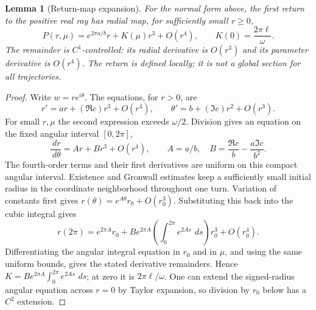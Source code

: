\documentclass[11pt,oneside]{book}
\newtheorem{lemma}[theorem]{Lemma}
\theoremstyle{definition}
\theoremstyle{remark}\newtheorem{remark}[theorem]{Remark}
\newcommand{\dd}{\,d}\newcommand{\id}{\operatorname{id}}
\begin{document}
\begin{lemma}[Return-map expansion]\label{d13:16:hopf-return-expansion}
For the normal form above, the first return to the positive real ray
has radial map, for sufficiently small \(r\geq0\),
\[
 P(r,\mu)=e^{2\pi a/b}r+K(\mu)r^3+O(r^4),\qquad
 K(0)=\frac{2\pi\ell}{\omega}.
\]
The remainder is \(C^1\)-controlled: its radial derivative is \(O(r^3)\)
and its parameter derivative is \(O(r^4)\). The return is defined
locally; it is not a global section for all trajectories.
\end{lemma}
\begin{proof}
Write \(w=re^{i\theta}\). The equations, for \(r>0\), are
\[
 r'=ar+(\Re c)r^3+O(r^4),\qquad
 \theta'=b+(\Im c)r^2+O(r^3).
\]
For small \(r,\mu\) the second expression exceeds \(\omega/2\).
Division gives an equation on the fixed angular interval \([0,2\pi]\),
\[
 \frac{\dd r}{\dd\theta}
 =Ar+Br^3+O(r^4),\qquad
 A=a/b,\quad B=\frac{\Re c}{b}-\frac{a\Im c}{b^2}.
\]
The fourth-order terms and their first derivatives are uniform on
this compact angular interval. Existence and Gronwall estimates keep
a sufficiently small initial radius in the coordinate neighborhood
throughout one turn. Variation of constants first gives
\(r(\theta)=e^{A\theta}r_0+O(r_0^3)\). Substituting this back into the
cubic integral gives
\[
 r(2\pi)=e^{2\pi A}r_0+
 B e^{2\pi A}\left(\int_0^{2\pi}e^{2As}\,\dd s\right)r_0^3
 +O(r_0^4).
\]
Differentiating the angular integral equation in \(r_0\) and in \(\mu\),
and using the same uniform bounds, gives the stated derivative
remainders. Hence \(K=B e^{2\pi A}\int_0^{2\pi}e^{2As}\,\dd s\);
at zero it is \(2\pi\ell/\omega\).
One can extend the signed-radius angular equation across \(r=0\)
by Taylor expansion, so division by \(r_0\) below has a \(C^2\) extension.
\end{proof}
\end{document}
